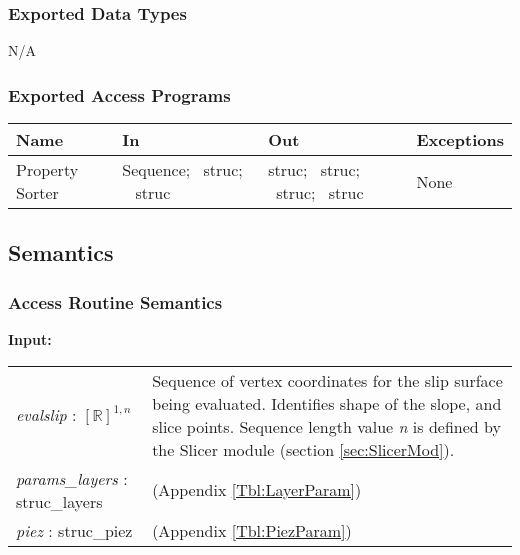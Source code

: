 \documentclass[12pt, titlepage]{article}
\begin{document}
\subsubsection{Exported Data Types}
N/A

\subsubsection{Exported Access Programs}

\begin{center}
	\renewcommand*{\arraystretch}{1.5}
	\begin{tabular} {p{}  p{}  p{} 
			p{} } \hline 
		\textbf{Name} & \textbf{In} & \textbf{Out} & \textbf{Exceptions} \\ 
		\hline

  Property Sorter & Sequence; ~\newline struc; ~\newline
  struc & struc; ~\newline struc; ~\newline struc; ~\newline struc &
  None \\ \hline
\end{tabular}
\end{center}

\subsection{Semantics}

\subsubsection{Access Routine Semantics}
\textbf{Input:}
\renewcommand*{\arraystretch}{1.5}
\begin{longtable}{p{} p{}}
  \textit{evalslip} : $[\mathbb{R}]^{1,n}$ & Sequence of vertex
  coordinates for the slip surface being evaluated. Identifies shape
  of the slope, and slice points. Sequence length value \textit{n} is
  defined by the Slicer module (section \ref{sec:SlicerMod}).  \\

  \textit{params\_layers} : struc\_layers & (Appendix
  \ref{Tbl:LayerParam}) \\
  
  \textit{piez} : struc\_piez & (Appendix \ref{Tbl:PiezParam})
  \\
\end{longtable}
\end{document}
